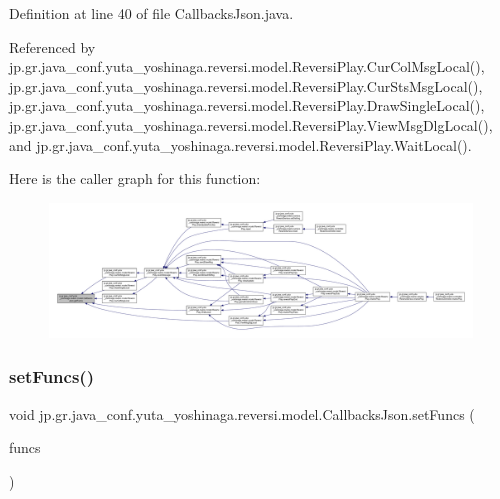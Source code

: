 Definition at line 40 of file Callbacks\+Json.\+java.



Referenced by jp.\+gr.\+java\+\_\+conf.\+yuta\+\_\+yoshinaga.\+reversi.\+model.\+Reversi\+Play.\+Cur\+Col\+Msg\+Local(), jp.\+gr.\+java\+\_\+conf.\+yuta\+\_\+yoshinaga.\+reversi.\+model.\+Reversi\+Play.\+Cur\+Sts\+Msg\+Local(), jp.\+gr.\+java\+\_\+conf.\+yuta\+\_\+yoshinaga.\+reversi.\+model.\+Reversi\+Play.\+Draw\+Single\+Local(), jp.\+gr.\+java\+\_\+conf.\+yuta\+\_\+yoshinaga.\+reversi.\+model.\+Reversi\+Play.\+View\+Msg\+Dlg\+Local(), and jp.\+gr.\+java\+\_\+conf.\+yuta\+\_\+yoshinaga.\+reversi.\+model.\+Reversi\+Play.\+Wait\+Local().

Here is the caller graph for this function\+:
\nopagebreak
\begin{figure}[H]
\begin{center}
\leavevmode
\includegraphics[width=350pt]{classjp_1_1gr_1_1java__conf_1_1yuta__yoshinaga_1_1reversi_1_1model_1_1_callbacks_json_af9a62a3dbe6416793c01d7a0f69da2b1_icgraph}
\end{center}
\end{figure}
\mbox{\label{classjp_1_1gr_1_1java__conf_1_1yuta__yoshinaga_1_1reversi_1_1model_1_1_callbacks_json_a6de1fc00c131167b4fe6231a660bdb6e}} 
\subsubsection{\texorpdfstring{set\+Funcs()}{setFuncs()}}
{\footnotesize\ttfamily void jp.\+gr.\+java\+\_\+conf.\+yuta\+\_\+yoshinaga.\+reversi.\+model.\+Callbacks\+Json.\+set\+Funcs (\begin{DoxyParamCaption}\item[{Array\+List$<$ \hyperlink{classjp_1_1gr_1_1java__conf_1_1yuta__yoshinaga_1_1reversi_1_1model_1_1_funcs_json}{Funcs\+Json} $>$}]{funcs }\end{DoxyParamCaption})}



